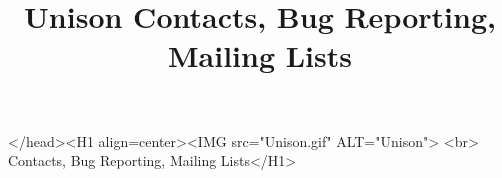 \documentclass{article}
\title{Unison Contacts, Bug Reporting, Mailing Lists}
\begin{document}
\begin{rawhtml}
</head><H1 align=center><IMG src="Unison.gif" ALT="Unison">
<br>
Contacts, Bug Reporting, Mailing Lists</H1>
\end{rawhtml}


\end{document}
